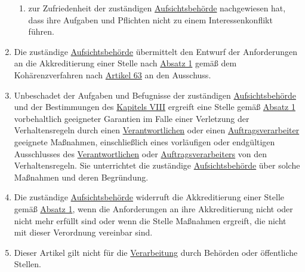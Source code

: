 \begin{enumerate}
\begin{enumerate}
    \item zur Zufriedenheit der zuständigen \hyperref[itm:04-21]{Aufsichtsbehörde} nachgewiesen hat, dass ihre Aufgaben
     und Pflichten nicht zu einem Interessenkonflikt führen.
    \label{itm:41-2d}

  \end{enumerate}

  \item Die zuständige \hyperref[itm:04-21]{Aufsichtsbehörde} übermittelt den Entwurf der Anforderungen an die
   Akkreditierung einer Stelle nach \hyperref[itm:41-1]{Absatz 1} gemäß dem Kohärenzverfahren nach \hyperref[ch:63]
   {Artikel 63} an den Ausschuss.
  \label{itm:41-3}

  \item Unbeschadet der Aufgaben und Befugnisse der zuständigen \hyperref[itm:04-21]{Aufsichtsbehörde} und der
   Bestimmungen des \hyperref[part:8]{Kapitels VIII} ergreift eine Stelle gemäß \hyperref[itm:41-1]{Absatz 1}
   vorbehaltlich geeigneter Garantien im Falle einer Verletzung der Verhaltensregeln durch einen \hyperref[itm:04-7]
   {Verantwortlichen} oder einen \hyperref[itm:04-8]{Auftragsverarbeiter} geeignete Maßnahmen, einschließlich eines
   vorläufigen oder endgültigen Ausschlusses des \hyperref[itm:04-7]{Verantwortlichen} oder \hyperref[itm:04-8]
   {Auftragsverarbeiters} von den Verhaltensregeln. Sie unterrichtet die zuständige \hyperref[itm:04-21]
   {Aufsichtsbehörde} über solche Maßnahmen und deren Begründung.
  \label{itm:41-4}

  \item Die zuständige \hyperref[itm:04-21]{Aufsichtsbehörde} widerruft die Akkreditierung einer Stelle gemäß \hyperref
   [itm:41-1]{Absatz 1}, wenn die Anforderungen an ihre Akkreditierung nicht oder nicht mehr erfüllt sind oder wenn
   die Stelle Maßnahmen ergreift, die nicht mit dieser Verordnung vereinbar sind.
  \label{itm:41-5}

  \item Dieser Artikel gilt nicht für die \hyperref[itm:04-2]{Verarbeitung} durch Behörden oder öffentliche Stellen.
  \label{itm:41-6}

\end{enumerate}


